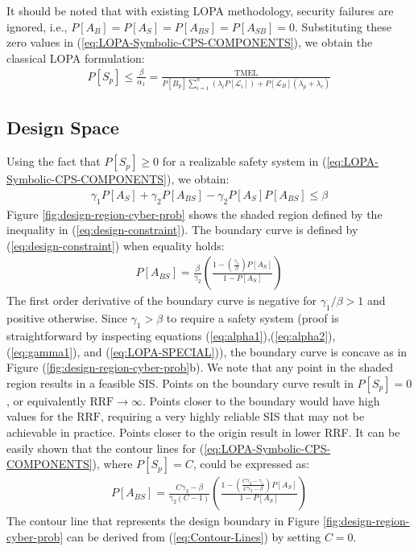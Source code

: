 \documentclass[journal]{IEEEtran}
\begin{document}
It should be noted that with existing LOPA methodology, security failures are ignored, i.e., $P[A_B]=P[A_S]=P[A_{BS}]=P[A_{SB}]=0$. Substituting these zero values in (\ref{eq:LOPA-Symbolic-CPS-COMPONENTS}), we obtain the classical LOPA formulation:
\begin{align}     
P[S_p] \leq \frac{\beta}{\alpha_1} = \frac{\text{TMEL}}{ P[B_p] \sum_{i=1}^n \left( \lambda_i P[\mathcal{L}_i] \right) + P[\mathcal{L}_B] (\lambda_p + \lambda_c)}
\label{eq:LOPA-SPECIAL}
\end{align}

\subsection{Design Space}
Using the fact that $P[S_p] \geq 0$ for a realizable safety system in (\ref{eq:LOPA-Symbolic-CPS-COMPONENTS}), we obtain:
\begin{align}
\gamma_1 P[A_S] + \gamma_2 P[A_{BS}] - \gamma_2 P[A_S]P[A_{BS}] \leq \beta        \label{eq:design-constraint}
\end{align}
Figure \ref{fig:design-region-cyber-prob} shows the shaded region defined by the inequality in (\ref{eq:design-constraint}). The boundary curve is defined by (\ref{eq:design-constraint}) when equality holds:
\begin{align}
P[A_{BS}] = \frac{\beta}{\gamma_2} \left( \frac{1-\left(\frac{\gamma_1}{\beta} \right) P[A_S]}{1-P[A_S]} \right) \label{eq:design-boundary}
\end{align}
The first order derivative of the boundary curve is negative for $\gamma_1/\beta > 1$ and positive otherwise. Since $\gamma_1 > \beta$ to require a safety system (proof is straightforward by inspecting equations (\ref{eq:alpha1}),(\ref{eq:alpha2}), (\ref{eq:gamma1}), and (\ref{eq:LOPA-SPECIAL})), the boundary curve is concave as in Figure (\ref{fig:design-region-cyber-prob}b). We note that any point in the shaded region results in a feasible SIS. Points on the boundary curve result in $P[S_p] = 0$, or equivalently $\text{RRF} \rightarrow \infty$. Points closer to the boundary would have high values for the $\text{RRF}$, requiring a very highly reliable SIS that may not be achievable in practice. Points closer to the origin result in lower RRF. It can be easily shown that the contour lines for (\ref{eq:LOPA-Symbolic-CPS-COMPONENTS}), where $P[S_p] = C$, could be expressed as:
\begin{align}
P[A_{BS}] = \frac{C \gamma_3 - \beta}{\gamma_2 (C-1)} \left( \frac{1 - \left(\frac{C \gamma_3 - \gamma_1}{C \gamma_3 - \beta}\right) P[A_S]}{1-P[A_S]} \right)
\label{eq:Contour-Lines}
\end{align}
The contour line that represents the design boundary in Figure \ref{fig:design-region-cyber-prob} can be derived from (\ref{eq:Contour-Lines}) by setting $C = 0$.
\end{document}

